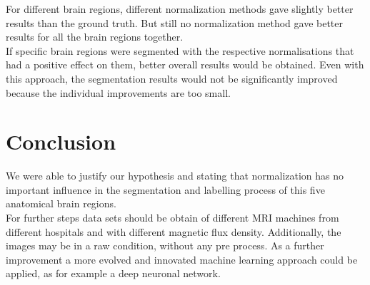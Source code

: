 \documentclass[article]{IEEEtran}
\begin{document}
\begin{multicols}{2}
	For different brain regions, different normalization methods gave slightly better results than the ground truth. 
	But still no normalization method gave better results for all the brain regions together.\\	
	
	If specific brain regions were segmented with the respective normalisations that had a positive effect on them, better overall results would be obtained. 
	Even with this approach, the segmentation results would not be significantly improved because the individual improvements are too small.



\section{Conclusion}
	We were able to justify our hypothesis and stating that normalization has no important influence in the segmentation and labelling process of this five anatomical brain regions. \\
	For further steps data sets should be obtain of different MRI machines from different hospitals and with different magnetic flux density.
	Additionally, the images may be in a raw condition, without any pre process.
	As a further improvement a more evolved and innovated machine learning approach could be applied, as for example a deep neuronal network.
	


 

\end{multicols}
\end{document}
